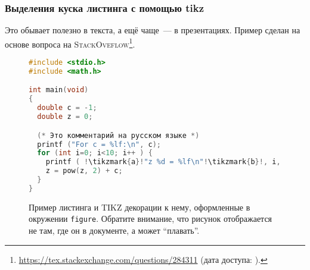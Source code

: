 \subsubsection{Выделения куска листинга с помощью tikz}
Это обывает полезно в текста, а ещё чаще~--- в презентациях. Пример сделан на основе вопроса на \textsc{StackOveflow}\footnote{\url{https://tex.stackexchange.com/questions/284311} (дата доступа:   ).}.

\begin{figure}
\begin{lstlisting}[escapechar=!, basicstyle=\ttfamily, language=c, keepspaces=true]
#include <stdio.h>
#include <math.h>

int main(void)
{
  double c = -1;
  double z = 0;

  (* Это комментарий на русском языке *)
  printf ("For c = %lf:\n", c);
  for (int i=0; i<10; i++ ) {
    printf ( !\tikzmark{a}!"z %d = %lf\n"!\tikzmark{b}!, i, z);
    z = pow(z, 2) + c;
  }
}
\end{lstlisting}

\caption{Пример листинга и \textsc{TIKZ} декорации к нему, оформленные в окружении \texttt{figure}. Обратите внимание, что рисунок отображается не там, где он в документе, а может \enquote{плавать}.}
\end{figure}
